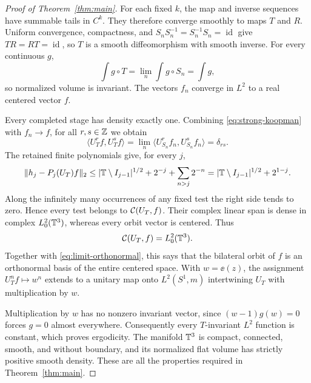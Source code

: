 \begin{proof}[Proof of Theorem~\ref{thm:main}]
For each fixed $k$, the map and inverse sequences have summable tails
in $C^k$.  They therefore converge smoothly to maps $T$ and $R$.
Uniform convergence, compactness, and
$S_nS_n^{-1}=S_n^{-1}S_n=\operatorname{id}$ give
$TR=RT=\operatorname{id}$, so $T$ is a smooth diffeomorphism with
smooth inverse.  For every continuous $g$,
\[
 \int g\circ T=\lim_n\int g\circ S_n=\int g,
\]
so normalized volume is invariant.  The vectors $f_n$ converge in
$L^2$ to a real centered vector $f$.

Every completed stage has density exactly one.  Combining
\eqref{eq:strong-koopman} with $f_n\to f$, for all $r,s\in\mathbb Z$ we obtain
\begin{equation}\label{eq:limit-orthonormal}
 \langle U_T^rf,U_T^sf\rangle
 =\lim_n\langle U_{S_n}^rf_n,U_{S_n}^sf_n\rangle
 =\delta_{rs}.
\end{equation}
The retained finite polynomials give, for every $j$,
\[
 \|h_j-P_j(U_T)f\|_2
 \le |\mathbb T\setminus I_{j-1}|^{1/2}+2^{-j}
       +\sum_{n>j}2^{-n}
 =|\mathbb T\setminus I_{j-1}|^{1/2}+2^{1-j}.
\]
Along the infinitely many occurrences of any fixed test the right side
tends to zero.  Hence every test belongs to $\mathcal C(U_T,f)$.  Their
complex linear span is dense in complex $L^2_0(\mathbb T^3)$, whereas every
orbit vector is centered.  Thus
\[
 \mathcal C(U_T,f)=L^2_0(\mathbb T^3).
\]
Together with \eqref{eq:limit-orthonormal}, this says that the bilateral
orbit of $f$ is an orthonormal basis of the entire centered space.
With $w=\ee(z)$, the assignment $U_T^nf\mapsto w^n$ extends to a
unitary map onto $L^2(S^1,m)$ intertwining $U_T$ with multiplication
by $w$.

Multiplication by $w$ has no nonzero invariant vector, since
$(w-1)g(w)=0$ forces $g=0$ almost everywhere.  Consequently every
$T$-invariant $L^2$ function is constant, which proves ergodicity.
The manifold $\mathbb T^3$ is compact, connected, smooth, and without
boundary, and its normalized flat volume has strictly positive smooth
density.  These are all the properties required in
Theorem~\ref{thm:main}.
\end{proof}
